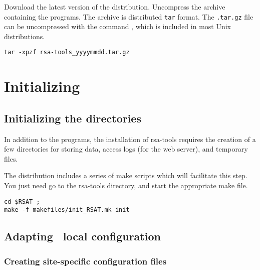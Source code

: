 \documentclass[12pt,a4paper, oneside]{scrreprt} %
\begin{document}
Download the latest version of the \RSAT distribution. Uncompress the
archive containing the programs. The archive is distributed
\texttt{tar} format. The \texttt{.tar.gz} file can be uncompressed
with the command , which is included in most Unix
distributions.

\begin{lstlisting}
tar -xpzf rsa-tools_yyyymmdd.tar.gz
\end{lstlisting}


\chapter{Initializing \RSAT}




\section{Initializing the directories}

In addition to the programs, the installation of rsa-tools requires
the creation of a few directories for storing data, access logs (for
the web server), and temporary files.

The distribution includes a series of make scripts which will
facilitate this step. You just need go to the rsa-tools directory, and
start the appropriate make file.

\begin{lstlisting}
cd $RSAT ; 
make -f makefiles/init_RSAT.mk init
\end{lstlisting}

\section{Adapting \RSAT \  local configuration}


\subsection{Creating site-specific configuration files}
\end{document}
